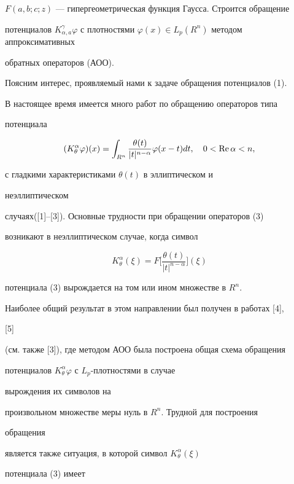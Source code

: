 $F(a,b;c;z)$ --- гипергеометрическая функция Гаусса. Строится обращение  


потенциалов $K^\gamma_{\alpha,a}\varphi$ с плотностями $\varphi(x)\in 


L_p(R^n)$ методом аппроксимативных 


обратных операторов (АОО). 


 


Поясним интерес, проявляемый нами к задаче обращения потенциалов (1).  


В настоящее время имеется много работ по обращению операторов типа 


потенциала  


\begin{equation} 


(K^\alpha_\theta\varphi)(x)=\int_{R^n}\frac{\theta(t)} 


{|t|^{n-\alpha}}\varphi(x-t)dt,\quad0<\re\alpha<n, 


\end{equation} 


с гладкими характеристиками $\theta(t)$ в эллиптическом и 


неэллиптическом  


случаях([1]--[3]). Основные трудности при обращении операторов (3)  


возникают в неэллиптическом случае, когда символ 


$$ 


K^\alpha_\theta(\xi)=F\bigg[\frac{\theta(t)}{|t|^{n-\alpha}} 


\bigg](\xi) 


$$ 


потенциала (3) вырождается на том или ином множестве в $R^n$. 


Наиболее общий результат в этом направлении был получен в работах [4], 


[5] 


(см. также [3]), где методом АОО была построена общая схема обращения  


потенциалов $K^\alpha_\theta\varphi$ с $L_p$-плотностями в случае 


вырождения их символов на  


произвольном множестве меры нуль в $R^n$. Трудной для построения 


обращения  


является также ситуация, в которой символ $K^\alpha_\theta(\xi)$ 


потенциала (3) имеет  


